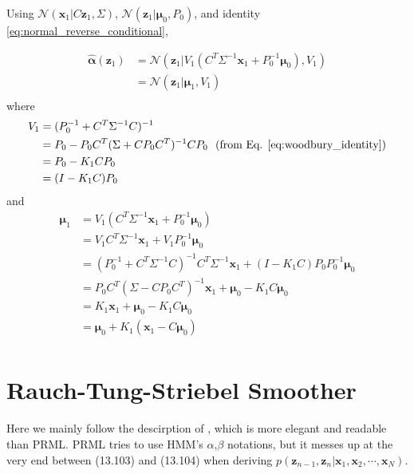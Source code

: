 \documentclass[a4]{article}
\begin{document}
Using $\mathcal{N}(\bm{x}_1 | C\bm{z}_{1}, \Sigma)$, $\mathcal{N}(\bm{z}_1|\bm{\mu}_{0}, P_{0})$, and
identity \ref{eq:normal_reverse_conditional}, 

\begin{equation}
\begin{aligned}
\hat{\bm{\alpha}}(\bm{z}_1) &= \mathcal{N}(\bm{z}_1 | V_1(C^T\Sigma^{-1}\bm{x}_1 + P_{0}^{-1}\bm{\mu}_{0}), V_1)\\
&= \mathcal{N}(\bm{z}_1 | \bm{\mu}_1, V_1)\\
\end{aligned}
\end{equation}
where
\begin{equation}
\begin{aligned}
V_1 &=(P_{0}^{-1} + C^T\Sigma^{-1}C)^{-1}\\
&= P_{0} - P_{0}C^T(\Sigma + CP_{0}C^T)^{-1}CP_{0} \:\:\:\text{(from Eq. \ref{eq:woodbury_identity})}\\
&= P_{0} - K_1CP_{0}\\
&= (I - K_1C)P_{0}\\
\end{aligned}
\end{equation}
and
\begin{equation}
\begin{aligned}
\bm{\mu}_1 &= V_1(C^T\Sigma^{-1}\bm{x}_1 + P_{0}^{-1}\bm{\mu}_{0})\\
&= V_1C^T\Sigma^{-1}\bm{x}_1 + V_1P_{0}^{-1}\bm{\mu}_{0}\\
&= (P_{0}^{-1} + C^T\Sigma^{-1}C)^{-1}C^T\Sigma^{-1}\bm{x}_1 + (I-K_1C)P_0P_{0}^{-1}\bm{\mu}_{0}\\
&= P_{0}C^T(\Sigma - CP_{0}C^T)^{-1}\bm{x}_1 + \bm{\mu}_{0} - K_1C\bm{\mu}_{0}\\
&= K_1\bm{x}_1 + \bm{\mu}_{0} - K_1C\bm{\mu}_{0}\\
&= \bm{\mu}_0 + K_1 (\bm{x}_1 - C\bm{\mu}_{0})\\
\end{aligned}
\end{equation}


\section{Rauch-Tung-Striebel Smoother}
Here we mainly follow the descirption of \cite{sarkka2011}, which is more elegant and readable than PRML\cite{bishop2007}. PRML tries to use HMM's $\alpha$,$\beta$ notations, but it messes up at the very end between (13.103) and (13.104)
when deriving $p(\bm{z}_{n-1}, \bm{z}_n | \bm{x}_1, \bm{x}_2, \cdots, \bm{x}_N)$.
\end{document}

